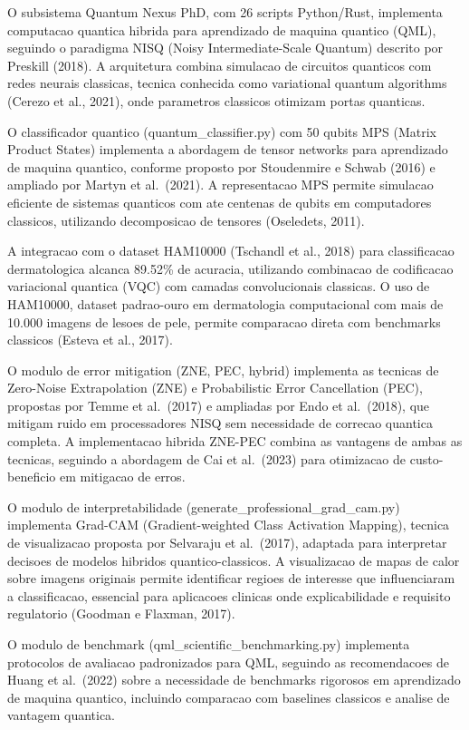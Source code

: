 \documentclass[
  12pt,
]{article}
\begin{document}
O subsistema Quantum Nexus PhD, com 26 scripts Python/Rust, implementa
computacao quantica hibrida para aprendizado de maquina quantico (QML),
seguindo o paradigma NISQ (Noisy Intermediate-Scale Quantum) descrito
por Preskill (2018). A arquitetura combina simulacao de circuitos
quanticos com redes neurais classicas, tecnica conhecida como
variational quantum algorithms (Cerezo et al., 2021), onde parametros
classicos otimizam portas quanticas.

O classificador quantico (quantum\_classifier.py) com 50 qubits MPS
(Matrix Product States) implementa a abordagem de tensor networks para
aprendizado de maquina quantico, conforme proposto por Stoudenmire e
Schwab (2016) e ampliado por Martyn et al.~(2021). A representacao MPS
permite simulacao eficiente de sistemas quanticos com ate centenas de
qubits em computadores classicos, utilizando decomposicao de tensores
(Oseledets, 2011).

A integracao com o dataset HAM10000 (Tschandl et al., 2018) para
classificacao dermatologica alcanca 89.52\% de acuracia, utilizando
combinacao de codificacao variacional quantica (VQC) com camadas
convolucionais classicas. O uso de HAM10000, dataset padrao-ouro em
dermatologia computacional com mais de 10.000 imagens de lesoes de pele,
permite comparacao direta com benchmarks classicos (Esteva et al.,
2017).

O modulo de error mitigation (ZNE, PEC, hybrid) implementa as tecnicas
de Zero-Noise Extrapolation (ZNE) e Probabilistic Error Cancellation
(PEC), propostas por Temme et al.~(2017) e ampliadas por Endo et
al.~(2018), que mitigam ruido em processadores NISQ sem necessidade de
correcao quantica completa. A implementacao hibrida ZNE-PEC combina as
vantagens de ambas as tecnicas, seguindo a abordagem de Cai et
al.~(2023) para otimizacao de custo-beneficio em mitigacao de erros.

O modulo de interpretabilidade (generate\_professional\_grad\_cam.py)
implementa Grad-CAM (Gradient-weighted Class Activation Mapping),
tecnica de visualizacao proposta por Selvaraju et al.~(2017), adaptada
para interpretar decisoes de modelos hibridos quantico-classicos. A
visualizacao de mapas de calor sobre imagens originais permite
identificar regioes de interesse que influenciaram a classificacao,
essencial para aplicacoes clinicas onde explicabilidade e requisito
regulatorio (Goodman e Flaxman, 2017).

O modulo de benchmark (qml\_scientific\_benchmarking.py) implementa
protocolos de avaliacao padronizados para QML, seguindo as recomendacoes
de Huang et al.~(2022) sobre a necessidade de benchmarks rigorosos em
aprendizado de maquina quantico, incluindo comparacao com baselines
classicos e analise de vantagem quantica.
\end{document}
